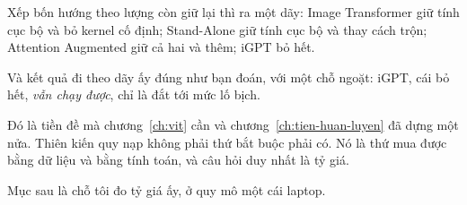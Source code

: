 %
Xếp bốn hướng theo lượng  còn giữ lại thì ra
một dãy: Image
Transformer giữ tính cục bộ và bỏ kernel cố định; Stand-Alone giữ tính cục bộ
và thay cách trộn; Attention Augmented giữ cả hai và thêm; iGPT bỏ hết.

Và kết quả đi theo dãy ấy đúng như bạn đoán, với một chỗ ngoặt: iGPT, cái bỏ
hết, \emph{vẫn chạy được}, chỉ là đắt tới mức lố bịch.

Đó là tiền đề mà chương~\ref{ch:vit} cần và
chương~\ref{ch:tien-huan-luyen} đã dựng một nửa. Thiên kiến quy nạp không phải thứ
bắt buộc phải có. Nó là thứ mua được bằng dữ liệu và bằng tính toán, và câu hỏi
duy nhất là tỷ giá.

Mục sau là chỗ tôi đo tỷ giá ấy, ở quy mô một cái laptop.
